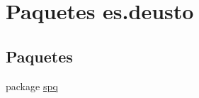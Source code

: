 \hypertarget{namespacees_1_1deusto}{\section{Paquetes es.\+deusto}
\label{namespacees_1_1deusto}
}
\subsection*{Paquetes}
\begin{DoxyCompactItemize}
\item 
package \hyperlink{namespacees_1_1deusto_1_1spq}{spq}
\end{DoxyCompactItemize}
